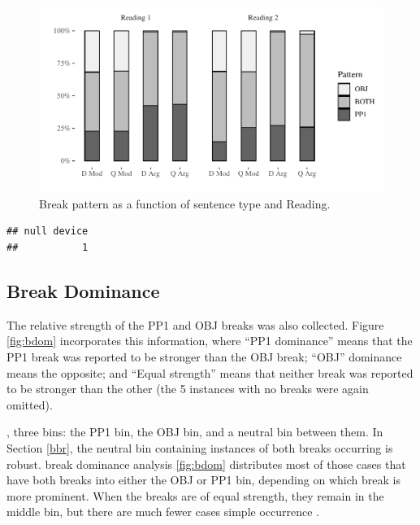 \documentclass[12pt,oneside]{book}
\begin{document}
\begin{figure}
\centering
\includegraphics{4-results_files/figure-latex/bothbreaks2-1.pdf}
\caption{\label{fig:bothbreaks2}Break pattern as a function of sentence type and Reading.}
\end{figure}

\begin{verbatim}
## null device 
##           1
\end{verbatim}

\hypertarget{break-dominance}{%
\subsection{Break Dominance}\label{break-dominance}}

The relative strength of the PP1 and OBJ breaks was also collected. Figure \ref{fig:bdom} incorporates this information, where ``PP1 dominance'' means that the PP1 break was reported to be stronger than the OBJ break; ``OBJ'' dominance means the opposite; and ``Equal strength'' means that neither break was reported to be stronger than the other (the 5 instances with no breaks were again omitted).

,  three bins: the PP1  bin, the OBJ  bin, and a neutral  bin between them. In Section \ref{bbr}, the neutral bin containing instances of both breaks occurring is robust.  break dominance analysis  \ref{fig:bdom} distributes most of those cases that have both breaks into either the OBJ or PP1 bin, depending on which break is more prominent. When the breaks are of equal strength, they remain in the middle bin, but there are much fewer  cases   simple occurrence .
\end{document}
